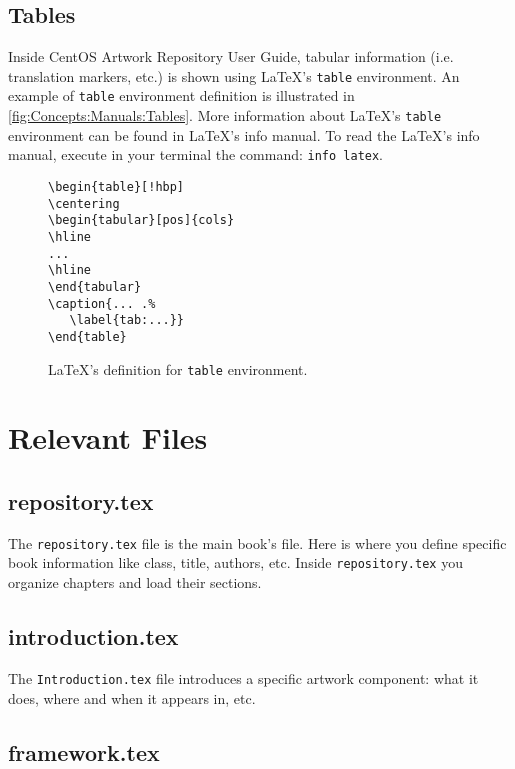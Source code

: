 \subsection{Tables}

Inside CentOS Artwork Repository User Guide, tabular information (i.e.
translation markers, etc.) is shown using \LaTeX's \texttt{table}
environment. An example of \texttt{table} environment definition is
illustrated in \autoref{fig:Concepts:Manuals:Tables}.  More
information about \LaTeX's \texttt{table} environment can be found in
\LaTeX's info manual. To read the \LaTeX's info manual, execute in
your terminal the command: \texttt{info latex}.

\begin{figure}[!hbp]
\hrulefill
\begin{verbatim}
\begin{table}[!hbp]
\centering
\begin{tabular}[pos]{cols}
\hline
...
\hline
\end{tabular}
\caption{... .%
   \label{tab:...}}
\end{table}
\end{verbatim}
\hrulefill
\caption{\LaTeX's definition for \texttt{table} environment.%
   \label{fig:Concepts:Manuals:Tables}}
\end{figure}

\section{Relevant Files}
\hypertarget{sec:Concepts:Manuals:Files}{}
\label{sec:Concepts:Manuals:Files}

\subsection{repository.tex}

The \texttt{repository.tex} file is the main book's file. Here is
where you define specific book information like class, title, authors,
etc.  Inside \texttt{repository.tex} you organize chapters and load
their sections.

\subsection{introduction.tex} 

The \texttt{Introduction.tex} file introduces a specific artwork
component: what it does, where and when it appears in, etc.

\subsection{framework.tex} 

